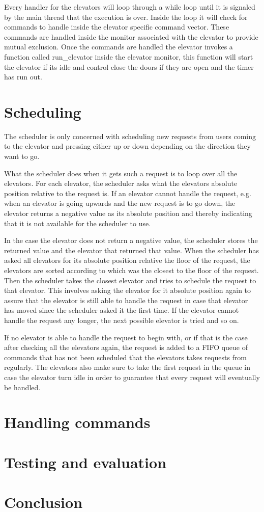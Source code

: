 \documentclass[10pt,a4paper]{article}
\begin{document}
Every handler for the elevators will loop through a while loop until it is signaled by the main thread that the execution is over. Inside the loop it will check for commands to handle inside the elevator specific command vector. These commands are handled inside the monitor associated with the elevator to provide mutual exclusion. Once the commands are handled the elevator invokes a function called run\_elevator inside the elevator monitor, this function will start the elevator if its idle and control close the doors if they are open and the timer has run out. 

\section{Scheduling}
The scheduler is only concerned with scheduling new requests from users coming to the elevator and pressing either up or down depending on the direction they want to go.

What the scheduler does when it gets such a request is to loop over all the elevators. For each elevator, the scheduler asks what the elevators absolute position relative to the request is. If an elevator cannot handle the request, e.g. when an elevator is going upwards and the new request is to go down, the elevator returns a negative value as its absolute position and thereby indicating that it is not available for the scheduler to use.

In the case the elevator does not return a negative value, the scheduler stores the returned value and the elevator that returned that value. When the scheduler has asked all elevators for its absolute position relative the floor of the request, the elevators are sorted according to which was the closest to the floor of the request. Then the scheduler takes the closest elevator and tries to schedule the request to that elevator. This involves asking the elevator for it absolute position
again to assure that the elevator is still able to handle the request in case that elevator has moved since the scheduler asked it the first time. If the elevator cannot handle the request any longer, the next possible elevator is tried and so on.

If no elevator is able to handle the request to begin with, or if that is the case after checking all the elevators again, the request is added to a FIFO queue of commands that has not been scheduled that the elevators takes requests from regularly. The elevators also make sure to take the first request in the queue in case the elevator turn idle in order to guarantee that every request will eventually be handled.

\section{Handling commands}

\section{Testing and evaluation}

\section{Conclusion}
\end{document}
